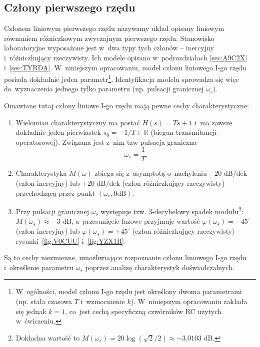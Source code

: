 \documentclass[paper=a4,DIV=12]{lpas}
\newcommand{\degree}{^{\circ}}
\begin{document}
\begin{appendices}
  \subsection{Człony pierwszego rzędu}
  \label{sec:LDB7J}

  Członem liniowym pierwszego rzędu nazywamy układ opisany liniowym równaniem
  różniczkowym zwyczajnym pierwszego rzędu. Stanowisko laboratoryjne wyposażone
  jest w~dwa typy tych członów -- inercyjny i~różniczkujący rzeczywisty. Ich
  modele opisano w~podrozdziałach \ref{sec:A9C2X} i~\ref{sec:TYRDA}.
  W~niniejszym opracowaniu, model członu liniowego I-go rzędu posiada dokładnie
  jeden parametr\footnote{W~ogólności, model członu I-go rzędu jest określony
  dwoma parametrami (np. stała czasowa $T$ i~wzmocnienie $k$). W~niniejszym
  opracowaniu zakłada się jednak $k=1$, co~jest cechą specyficzną czwórników RC
  użytych w~ćwiczeniu.}. Identyfikacja modelu sprowadza się więc do~wyznaczenia
  jednego tylko parametru (np. pulsacji granicznej $\omega_s$).

  Omawiane tutaj człony liniowe I-go rzędu mają pewne cechy charakterystyczne:
  \begin{enumerate}
    \item Wielomian charakterystyczny ma postać $H(s) = Ts+1$ i~ma zawsze
      dokładnie jeden pierwiastek $s_0 = -1/T \in \mathbb{R}$ (biegun
      transmitancji operatorowej). Związana jest z~nim tzw pulsacja graniczna
      \begin{equation}
        \omega_s = \frac{1}{T}.
        \label{eq:3UCS1}
      \end{equation}
    \item Charakterystyka $M(\omega)$ zbiega się z~asymptotą o~nachyleniu
      $-20\text{ dB/dek}$ (człon inercyjny) lub $+20\text{ dB/dek}$ (człon
      różniczkujący rzeczywisty) przechodzącą przez punkt
      $(\omega_s,0\text{dB})$.
    \item Przy pulsacji granicznej $\omega_s$ występuje tzw. 3-decybelowy spadek
      modułu\footnote{Dokładna wartość to $M(\omega_s) = 20 \log{(\sqrt{2}/2)}
      \approx -3.0103\text{ dB}$.}: $M(\omega_s) \approx -3\text{ dB}$,
      a~przesunięcie fazowe przyjmuje wartość $\varphi(\omega_s) = -45\degree$
      (człon inercyjny) lub $\varphi(\omega_s) = +45\degree$ (człon
      różniczkujący rzeczywisty) -- rysunki~\ref{fig:V0CUU} i~\ref{fig:YZX1R}.
  \end{enumerate}
  Są to cechy niezmienne, umożliwiające rozpoznanie członu liniowego I-go rzędu
  i~określenie parametru $\omega_s$ poprzez analizę charakterystyk
  doświadczalnych.


\end{appendices}
\end{document}
